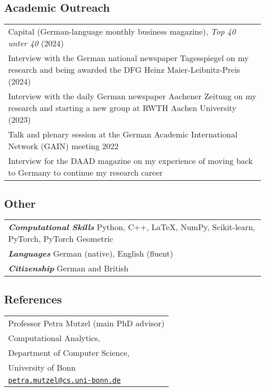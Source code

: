 \documentclass[11pt, a4paper, DIV=14, headings=small]{scrartcl}
\begin{document}
	\subsection*{Academic Outreach}
	\begin{longtabu}{p{14.5cm}}	
		Capital (German-language monthly business magazine), \emph{Top 40 unter 40} (2024) \\
		
	Interview with the German national newspaper Tagesspiegel on my research and being awarded the DFG Heinz Maier-Leibnitz-Preis (2024) \\		
	
		Interview with the daily German newspaper Aachener Zeitung on my research and starting a new group at RWTH Aachen University (2023)\\	
		Talk and plenary session at the German Academic International Network (GAIN) meeting 2022 \\
		
		Interview for the DAAD magazine on my experience of moving back to Germany to continue my research career
	\end{longtabu}
	
	\subsection*{Other}
	
	\begin{longtabu}{p{14.5cm}} 
		\textsf{\textbf{\em Computational Skills}} Python, C\hspace{-1pt}+\hspace{-1pt}+, \LaTeX, NumPy, Scikit-learn, PyTorch, PyTorch Geometric \\
		\textsf{\textbf{\em Languages}} German (native), English (fluent)                                                                         \\
		\textsf{\textbf{\em Citizenship}} German and British\\
	\end{longtabu}
		\renewcommand{\arraystretch}{1.0}
	\subsection*{References}
	
	\begin{tabular}{l}
		Professor Petra Mutzel (main PhD advisor)                                       \\
		Computational Analytics,                                                        \\
		Department of Computer Science,                                                 \\
		University of Bonn                                                              \\
		\href{mailto:petra.mutzel@cs.uni-bonn.de}{\texttt{petra.mutzel@cs.uni-bonn.de}} \\
	\end{tabular}\\[0.5em]
	
\end{document}

